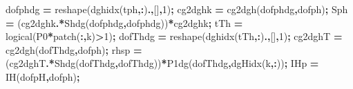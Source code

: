 \documentclass[
]{article}
\newenvironment{Shaded}{\begin{snugshade}}{\end{snugshade}}
\newcommand{\FloatTok}[1]{\textcolor[rgb]{0.00,0.00,0.81}{#1}}
\newcommand{\NormalTok}[1]{#1}
\newcommand{\OperatorTok}[1]{\textcolor[rgb]{0.81,0.36,0.00}{\textbf{#1}}}
\newcommand{\VariableTok}[1]{\textcolor[rgb]{0.00,0.00,0.00}{#1}}
\begin{document}
\begin{Shaded}
\begin{Highlighting}[]
    \VariableTok{dofphdg} \OperatorTok{=} \VariableTok{reshape}\NormalTok{(}\VariableTok{dghidx}\NormalTok{(}\VariableTok{tph}\OperatorTok{,:}\NormalTok{)}\OperatorTok{.\textquotesingle{},}\NormalTok{[]}\OperatorTok{,}\FloatTok{1}\NormalTok{)}\OperatorTok{;}
    \VariableTok{cg2dghk} \OperatorTok{=} \VariableTok{cg2dgh}\NormalTok{(}\VariableTok{dofphdg}\OperatorTok{,}\VariableTok{dofph}\NormalTok{)}\OperatorTok{;}
    \VariableTok{Sph} \OperatorTok{=}\NormalTok{ (}\VariableTok{cg2dghk}\OperatorTok{.\textquotesingle{}*}\VariableTok{Shdg}\NormalTok{(}\VariableTok{dofphdg}\OperatorTok{,}\VariableTok{dofphdg}\NormalTok{))}\OperatorTok{*}\VariableTok{cg2dghk}\OperatorTok{;}
    \VariableTok{tTh} \OperatorTok{=} \VariableTok{logical}\NormalTok{(}\VariableTok{P0}\OperatorTok{*}\VariableTok{patch}\NormalTok{(}\OperatorTok{:,}\VariableTok{k}\NormalTok{)}\OperatorTok{\textgreater{}}\FloatTok{1}\NormalTok{)}\OperatorTok{;}
    \VariableTok{dofThdg} \OperatorTok{=} \VariableTok{reshape}\NormalTok{(}\VariableTok{dghidx}\NormalTok{(}\VariableTok{tTh}\OperatorTok{,:}\NormalTok{)}\OperatorTok{.\textquotesingle{},}\NormalTok{[]}\OperatorTok{,}\FloatTok{1}\NormalTok{)}\OperatorTok{;}
    \VariableTok{cg2dghT} \OperatorTok{=} \VariableTok{cg2dgh}\NormalTok{(}\VariableTok{dofThdg}\OperatorTok{,}\VariableTok{dofph}\NormalTok{)}\OperatorTok{;}
    \VariableTok{rhsp} \OperatorTok{=}\NormalTok{ (}\VariableTok{cg2dghT}\OperatorTok{.\textquotesingle{}*}\VariableTok{Shdg}\NormalTok{(}\VariableTok{dofThdg}\OperatorTok{,}\VariableTok{dofThdg}\NormalTok{))}\OperatorTok{*}\VariableTok{P1dg}\NormalTok{(}\VariableTok{dofThdg}\OperatorTok{,}\VariableTok{dgHidx}\NormalTok{(}\VariableTok{k}\OperatorTok{,:}\NormalTok{))}\OperatorTok{;}
    \VariableTok{IHp} \OperatorTok{=} \VariableTok{IH}\NormalTok{(}\VariableTok{dofpH}\OperatorTok{,}\VariableTok{dofph}\NormalTok{)}\OperatorTok{;}


\end{Highlighting}
\end{Shaded}
\end{document}
